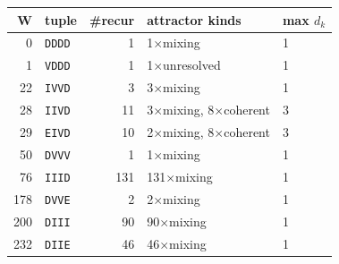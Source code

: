 \begin{tabular}{@{}rl r l l@{}}
\toprule
W & tuple & \#recur & attractor kinds & max $d_k$ \\
\midrule
0 & \texttt{DDDD} & 1 & 1$\times$mixing & 1 \\
1 & \texttt{VDDD} & 1 & 1$\times$unresolved & 1 \\
22 & \texttt{IVVD} & 3 & 3$\times$mixing & 1 \\
28 & \texttt{IIVD} & 11 & 3$\times$mixing, 8$\times$coherent & 3 \\
29 & \texttt{EIVD} & 10 & 2$\times$mixing, 8$\times$coherent & 3 \\
50 & \texttt{DVVV} & 1 & 1$\times$mixing & 1 \\
76 & \texttt{IIID} & 131 & 131$\times$mixing & 1 \\
178 & \texttt{DVVE} & 2 & 2$\times$mixing & 1 \\
200 & \texttt{DIII} & 90 & 90$\times$mixing & 1 \\
232 & \texttt{DIIE} & 46 & 46$\times$mixing & 1 \\
\bottomrule
\end{tabular}
